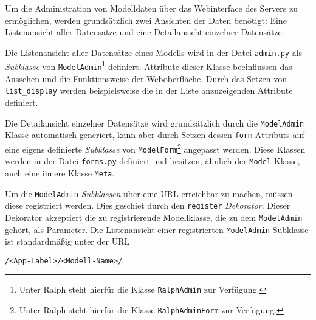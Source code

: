 Um die Administration von Modelldaten über das Webinterface des Servers
zu ermöglichen, werden grundsätzlich zwei Ansichten der Daten benötigt:
Eine Listenansicht aller Datensätze und eine Detailansicht einzelner
Datensätze.

Die Listenansicht aller Datensätze eines Modells wird in der Datei
\texttt{admin.py} als
\emph{Subklasse}
von \texttt{ModelAdmin}\footnote{Unter Ralph steht hierfür die Klasse
  \texttt{RalphAdmin} zur Verfügung.\cite{ralph-admin-doku}} definiert.
Attribute dieser Klasse beeinflussen das Aussehen und die Funktionsweise
der Weboberfläche. Durch das Setzen von \texttt{list\_display} werden
beispielsweise die in der Liste anzuzeigenden Attribute definiert.

Die Detailansicht einzelner Datensätze wird grundsätzlich durch die
\texttt{ModelAdmin} Klasse automatisch generiert, kann aber durch Setzen
dessen \texttt{form} Attributs auf eine eigens definierte
\emph{Subklasse}
von \texttt{ModelForm}\footnote{Unter Ralph steht hierfür die Klasse
  \texttt{RalphAdminForm} zur Verfügung.} angepasst werden. Diese
Klassen werden in der Datei \texttt{forms.py} definiert und besitzen,
ähnlich der \texttt{Model} Klasse, auch eine innere Klasse
\texttt{Meta}.

Um die \texttt{ModelAdmin}
\emph{Subklassen}
über eine URL erreichbar zu machen, müssen diese registriert werden.
Dies geschiet durch den \texttt{register}
\emph{Dekorator}.
Dieser Dekorator akzeptiert die zu registrierende Modellklasse, die zu
dem \texttt{ModelAdmin} gehört, als Parameter. Die Listenansicht einer
registrierten \texttt{ModelAdmin} Subklasse ist standardmäßig unter der
URL

\begin{verbatim}
/<App-Label>/<Modell-Name>/
\end{verbatim}

